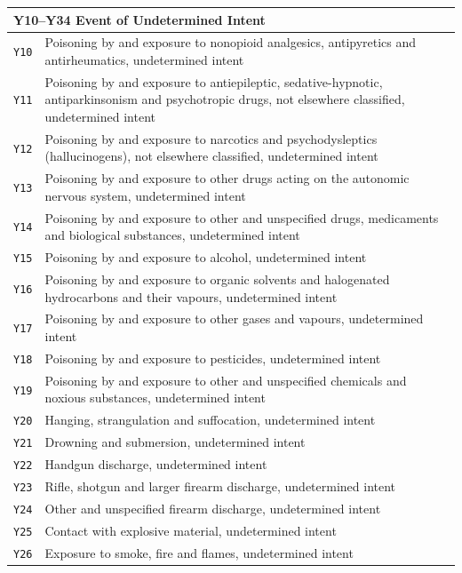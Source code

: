 \begin{longtable}{p{2.2cm} p{10.3cm}}
\multicolumn{2}{l}{\textbf{Y10--Y34 \quad Event of Undetermined Intent}} \\
\midrule
\texttt{Y10} & Poisoning by and exposure to nonopioid analgesics, antipyretics and antirheumatics, undetermined intent \\
\texttt{Y11} & Poisoning by and exposure to antiepileptic, sedative-hypnotic, antiparkinsonism and psychotropic drugs, not elsewhere classified, undetermined intent \\
\texttt{Y12} & Poisoning by and exposure to narcotics and psychodysleptics (hallucinogens), not elsewhere classified, undetermined intent \\
\texttt{Y13} & Poisoning by and exposure to other drugs acting on the autonomic nervous system, undetermined intent \\
\texttt{Y14} & Poisoning by and exposure to other and unspecified drugs, medicaments and biological substances, undetermined intent \\
\texttt{Y15} & Poisoning by and exposure to alcohol, undetermined intent \\
\texttt{Y16} & Poisoning by and exposure to organic solvents and halogenated hydrocarbons and their vapours, undetermined intent \\
\texttt{Y17} & Poisoning by and exposure to other gases and vapours, undetermined intent \\
\texttt{Y18} & Poisoning by and exposure to pesticides, undetermined intent \\
\texttt{Y19} & Poisoning by and exposure to other and unspecified chemicals and noxious substances, undetermined intent \\
\texttt{Y20} & Hanging, strangulation and suffocation, undetermined intent \\
\texttt{Y21} & Drowning and submersion, undetermined intent \\
\texttt{Y22} & Handgun discharge, undetermined intent \\
\texttt{Y23} & Rifle, shotgun and larger firearm discharge, undetermined intent \\
\texttt{Y24} & Other and unspecified firearm discharge, undetermined intent \\
\texttt{Y25} & Contact with explosive material, undetermined intent \\
\texttt{Y26} & Exposure to smoke, fire and flames, undetermined intent \\

\end{longtable}
